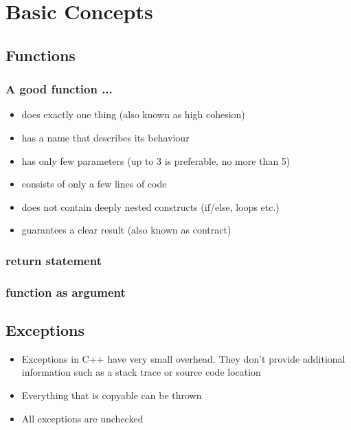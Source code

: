 \section{Basic Concepts}

  \subsection{Functions}
    \subsubsection{A good function ...}
    \begin{itemize}
      \item does exactly one thing (also known as high cohesion)
      \item has a name that describes its behaviour
      \item has only few parameters (up to 3 is preferable, no more than 5)
      \item consists of only a few lines of code
      \item does not contain deeply nested constructs (if/else, loops etc.)
      \item guarantees a clear result (also known as contract)
    \end{itemize}
    \subsubsection{return statement}
    \subsubsection{function as argument}

  \newpage
  \subsection{Exceptions}
    \begin{itemize}
      \item Exceptions in C++ have very small overhead. They don't provide additional
            information such as a stack trace or source code location
      \item Everything that is copyable can be thrown
      \item All exceptions are unchecked
    \end{itemize}


